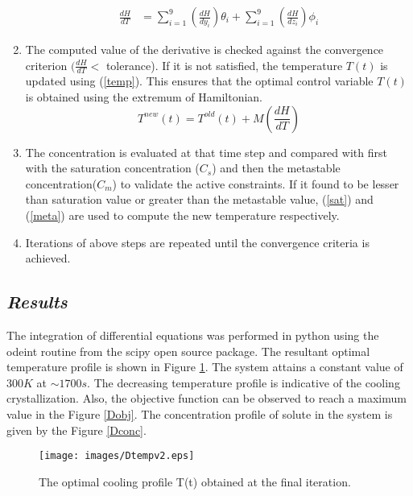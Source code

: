 \documentclass[3p,times,authoryear]{elsarticle}
\begin{document}
\begin{enumerate}
\begin{align}
\frac{dH}{dT} &= \sum_{i=1}^{9} \left( \frac{dH}{dy_{i}}\right) \theta_{i}  + \sum_{i=1}^{9} \left(\frac{dH}{dz_{i}}\right) \phi_{i}  \label{hamiltd} 
\end{align}
\item The computed value of the derivative is checked against the convergence criterion $(\frac{dH}{dT}<$ tolerance). If it is not satisfied, the temperature $T(t)$ is updated using (\ref{temp}). This ensures that the optimal control variable $T(t)$ is obtained using the extremum of Hamiltonian. 
\begin{equation} 
T^{new}(t) = T^{old}(t) + M\left(\frac{dH}{dT} \right) \label{temp}
\end{equation}
\item The concentration is evaluated  at that time step and compared with first with the saturation concentration ($C_{s}$) and then the metastable concentration($C_{m}$) to validate the active constraints. If it found to be lesser than saturation value or greater than the metastable value, (\ref{sat}) and (\ref{meta}) are used to compute the new temperature respectively. 
\item Iterations of above steps are repeated until the convergence criteria is achieved.
\end{enumerate}

\subsection{\textit{Results}}
The integration of differential equations was performed in python using the odeint routine from the scipy open source package.
The resultant optimal temperature profile is shown in Figure \ref{Dtemp}. The system attains a constant value of $300 K$ at $\sim1700 s$. The decreasing temperature profile is indicative of the cooling crystallization. Also, the objective function can be observed to reach a maximum value in the Figure \ref{Dobj}. The concentration profile of solute in the system is given by the Figure \ref{Dconc}. 

\begin{figure}[H] 
\begin{center}
\texttt{[image: images/Dtempv2.eps]}
\end{center}
\caption{The optimal cooling profile T(t) obtained at the final iteration.} \label{Dtemp}
\end{figure}
\end{document}

